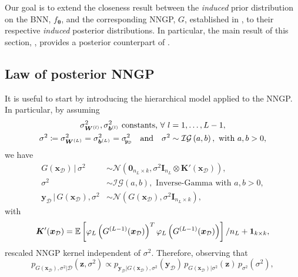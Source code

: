 \documentclass[a4paper, 11pt, reqno]{amsart}
\theoremstyle{plain}
\theoremstyle{remark}
\theoremstyle{definition}
\newcommand{\mean}[2][\kern-0.5pt]{\mathbb{E}_{#1}\left[#2\right]}
\newcommand{\given}{\, | \,}
\newcommand{\normal}[2]{\mathcal{N}\left(#1, #2\right)}
\newcommand{\invgamma}[2]{\mathcal{IG}\left(#1, #2\right)}
\let\oldforall\forall
\renewcommand{\forall}{\oldforall\,}
\newcommand{\train}{\mathcal{D}}
\newcommand{\sigmay}{\sigma_{\scalebox{0.65}{$\kern-3pt\bm{y}_{\mathcal{D}}$}}}%
\begin{document}
Our goal is to extend the closeness result between the \textit{induced} prior distribution on the BNN, $f_{\bm{\theta}}$, and the corresponding NNGP, $G$, established in , to their respective \textit{induced} posterior distributions. In particular, the main result of this section, , provides a posterior counterpart of .

\subsection{Law of posterior NNGP} \label{subsec:nngplaw}

It is useful to start by introducing the hierarchical model applied to the NNGP. In particular, by assuming
\begin{equation} \label{eq:hiervariancenngp}
    \begin{gathered}	
        \sigma_{\bm{W}^{(l)}}^2, \sigma_{\bm{b}^{(l)}}^2 \text{ constants, } \forall l = 1, \dots, L - 1, \\
        \sigma^2 \coloneqq \sigma_{\bm{W}^{(L)}}^2 = \sigma_{\bm{b}^{(L)}}^2 = \sigmay^2 \quad \text{and} \quad \sigma^2 \sim \invgamma{a}{b}, \text{ with } a, b > 0,
    \end{gathered}
\end{equation}
we have
\begin{equation} \label{eq:hiermodel}
    \begin{aligned}
        G(\bm{x}_{\mathcal{D}}) \given \sigma^2 & \sim \normal{\bm{0}_{n_L \times k}}{\sigma^2 \bm{I}_{n_L} \otimes \bm{K}'(\bm{x}_{\mathcal{D}})}, \\
        \sigma^2 & \sim \invgamma{a}{b}, \text{ Inverse-Gamma with } a, b > 0, \\
        \bm{y}_{\mathcal{D}} \given G(\bm{x}_{\mathcal{D}}), \sigma^2 & \sim \normal{G(\bm{x}_{\mathcal{D}})}{\sigma^2 \bm{I}_{n_L \times k}},
    \end{aligned}
\end{equation}
with
\begin{align} \label{eq:rescaledkernel}
    \bm{K}'(\bm{x}_{\mathcal{D}}) = \mean{\varphi_{L}\left(G^{(L - 1)}(\bm{x}_{\mathcal{D}})\right)^T \varphi_{L}\left(G^{(L - 1)}(\bm{x}_{\mathcal{D}})\right)} / n_L + \bm{1}_{k \times k},
\end{align}
rescaled NNGP kernel independent of $\sigma^2$. Therefore, observing that
\begin{equation*}
    p_{G(\bm{x}_{\mathcal{D}}), \sigma^2 | \train}(\bm{z}, \sigma^2) \propto p_{\bm{y}_{\mathcal{D}} | G(\bm{x}_{\mathcal{D}}), \sigma^2}(\bm{y}_{\mathcal{D}}) \, p_{G(\bm{x}_{\mathcal{D}}) | \sigma^2}(\bm{z}) \, p_{\sigma^2}(\sigma^2),
\end{equation*}
\end{document}
